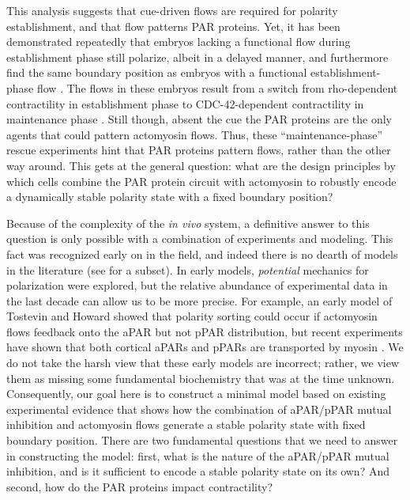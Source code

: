 \documentclass[11pt]{article}
\newcommand{\6}[1]{#1_{\text{6}}}
\newcommand{\3}[1]{#1_{\text{3}}}
\begin{document}
This analysis suggests that cue-driven flows are required for polarity establishment, and that flow patterns PAR proteins. Yet, it has been demonstrated repeatedly that embryos lacking a functional flow during establishment phase still polarize, albeit in a delayed manner, and furthermore find the same boundary position as embryos with a functional establishment-phase flow \cite{zonies2010symmetry, tse2012rhoa}. The flows in these embryos result from a switch from rho-dependent contractility in establishment phase to CDC-42-dependent contractility in maintenance phase \cite{schonegg2006cdc}. Still though, absent the cue the PAR proteins are the only agents that could pattern actomyosin flows. Thus, these ``maintenance-phase'' rescue experiments hint that PAR proteins pattern flows, rather than the other way around. This gets at the general question: what are the design principles by which cells combine the PAR protein circuit with actomyosin to robustly encode a dynamically stable polarity state with a fixed boundary position?

Because of the complexity of the \emph{in vivo} system, a definitive answer to this question is only possible with a combination of experiments and modeling. This fact was recognized early on in the field, and indeed there is no dearth of models in the literature (see \cite{TH2008, dawes20113, dawes2013cortical, gessele2020geometric, gross2019guiding, goehring2011polarization, kravtsova2014actomyosin} for a subset). In early models, \emph{potential} mechanics for polarization were explored, but the relative abundance of experimental data in the last decade can allow us to be more precise. For example, an early model of Tostevin and Howard showed that polarity sorting could occur if actomyosin flows feedback onto the aPAR \cite{TH2008} but not pPAR distribution, but recent experiments have shown that both cortical aPARs and pPARs are transported by myosin \cite{illukkumbura2023design}. We do not take the harsh view that these early models are incorrect; rather, we view them as missing some fundamental biochemistry that was at the time unknown. Consequently, our goal here is to construct a minimal model based on existing experimental evidence that shows how the combination of aPAR/pPAR mutual inhibition and actomyosin flows generate a stable polarity state with fixed boundary position. There are two fundamental questions that we need to answer in constructing the model: first, what is the nature of the aPAR/pPAR mutual inhibition, and is it sufficient to encode a stable polarity state on its own? And second, how do the PAR proteins impact contractility? 
\end{document}

